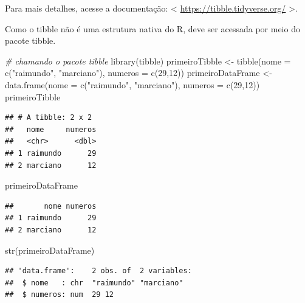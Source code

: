 \documentclass[
]{book}
\newenvironment{Shaded}{\begin{snugshade}}{\end{snugshade}}
\newcommand{\AttributeTok}[1]{\textcolor[rgb]{0.77,0.63,0.00}{#1}}
\newcommand{\CommentTok}[1]{\textcolor[rgb]{0.56,0.35,0.01}{\textit{#1}}}
\newcommand{\DecValTok}[1]{\textcolor[rgb]{0.00,0.00,0.81}{#1}}
\newcommand{\FunctionTok}[1]{\textcolor[rgb]{0.00,0.00,0.00}{#1}}
\newcommand{\NormalTok}[1]{#1}
\newcommand{\OtherTok}[1]{\textcolor[rgb]{0.56,0.35,0.01}{#1}}
\newcommand{\StringTok}[1]{\textcolor[rgb]{0.31,0.60,0.02}{#1}}
\begin{document}
Para mais detalhes, acesse a documentação: \textless{} \url{https://tibble.tidyverse.org/} \textgreater.

Como o tibble não é uma estrutura nativa do R, deve ser acessada por meio do pacote tibble.

\begin{Shaded}
\begin{Highlighting}[]
\CommentTok{\# chamando o pacote tibble}
\FunctionTok{library}\NormalTok{(tibble)}
\NormalTok{primeiroTibble }\OtherTok{\textless{}{-}} \FunctionTok{tibble}\NormalTok{(}\AttributeTok{nome =} \FunctionTok{c}\NormalTok{(}\StringTok{"raimundo"}\NormalTok{, }\StringTok{"marciano"}\NormalTok{), }\AttributeTok{numeros =} \FunctionTok{c}\NormalTok{(}\DecValTok{29}\NormalTok{,}\DecValTok{12}\NormalTok{))}
\NormalTok{primeiroDataFrame }\OtherTok{\textless{}{-}} \FunctionTok{data.frame}\NormalTok{(}\AttributeTok{nome =} \FunctionTok{c}\NormalTok{(}\StringTok{"raimundo"}\NormalTok{, }\StringTok{"marciano"}\NormalTok{), }\AttributeTok{numeros =} \FunctionTok{c}\NormalTok{(}\DecValTok{29}\NormalTok{,}\DecValTok{12}\NormalTok{))}
\NormalTok{primeiroTibble}
\end{Highlighting}
\end{Shaded}

\begin{verbatim}
## # A tibble: 2 x 2
##   nome     numeros
##   <chr>      <dbl>
## 1 raimundo      29
## 2 marciano      12
\end{verbatim}

\begin{Shaded}
\begin{Highlighting}[]
\NormalTok{primeiroDataFrame}
\end{Highlighting}
\end{Shaded}

\begin{verbatim}
##       nome numeros
## 1 raimundo      29
## 2 marciano      12
\end{verbatim}

\begin{Shaded}
\begin{Highlighting}[]
\FunctionTok{str}\NormalTok{(primeiroDataFrame)}
\end{Highlighting}
\end{Shaded}

\begin{verbatim}
## 'data.frame':    2 obs. of  2 variables:
##  $ nome   : chr  "raimundo" "marciano"
##  $ numeros: num  29 12
\end{verbatim}
\end{document}

